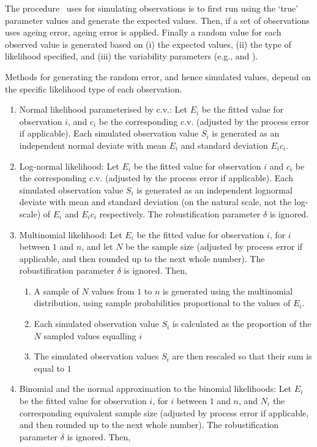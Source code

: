 The procedure \SPM\ uses for simulating observations is to first run using the `true' parameter values and generate the expected values. Then, if a set of observations uses ageing error, ageing error is applied. Finally a random value for each observed value is generated based on (i) the expected values, (ii) the type of likelihood specified, and (iii) the variability parameters (e.g.,  and ). 

Methods for generating the random error, and hence simulated values, depend on the specific likelihood type of each observation. 

\begin{enumerate}
  \item{} Normal likelihood parameterised by c.v.: Let $E_{i}$ be the fitted value for observation $i$, and $c_i$ be the corresponding c.v. (adjusted by the process error if applicable). Each simulated observation value $S_i$ is generated as an independent normal deviate with mean $E_i$ and standard deviation $E_i c_i$.
  \item{} Log-normal likelihood: Let $E_i$ be the fitted value for observation $i$ and $c_i$ be the corresponding c.v. (adjusted by the process error if applicable). Each simulated observation value $S_i$ is generated as an independent lognormal deviate with mean and standard deviation (on the natural scale, not the log-scale) of $E_i$ and $E_i c_i$ respectively. The robustification parameter $\delta$ is ignored.
  \item{} Multinomial likelihood: Let $E_i$ be the fitted value for observation $i$, for $i$ between $1$ and $n$, and let $N$ be the sample size (adjusted by process error if applicable, and then rounded up to the next whole number). The robustification parameter $\delta$ is ignored. Then, 
  \begin{enumerate}
    \item{} A sample of $N$ values from $1$ to $n$ is generated using the multinomial distribution, using sample probabilities proportional to the values of $E_i$.
    \item{} Each simulated observation value $S_i$ is calculated as the proportion of the $N$ sampled values equalling $i$
    \item{} The simulated observation values $S_i$ are then rescaled so that their sum is equal to $1$
  \end{enumerate}
\item{} Binomial and the normal approximation to the binomial likelihoods: Let $E_i$ be the fitted value for observation $i$, for $i$ between $1$ and $n$, and $N_i$ the corresponding equivalent sample size (adjusted by process error if applicable, and then rounded up to the next whole number). The robustification parameter $\delta$ is ignored. Then, 

\end{enumerate}

